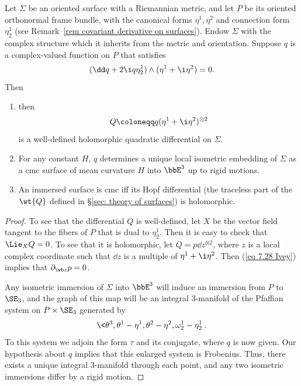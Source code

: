 \begin{prop}\label{prop 7.4.25 Ivey}
    Let $\Sigma$ be an oriented surface with a Riemannian metric, and let $P$ be its oriented orthonormal frame bundle, with the canonical forms $\eta^1,\eta^2$ and connection form $\eta^1_2$ (see Remark~\ref{rem covariant derivative on surfaces}). Endow $\Sigma$ with the complex structure which it inherits from the metric and orientation. Suppose $q$ is a complex-valued function on $P$ that satisfies 
    \[(\dd q+2\i q\eta^1_2)\wedge(\eta^1+\i \eta^2)=0.\label{eq 7.28 Ivey}\]
    Then 
    \begin{enumerate}
        \item then
        \[Q\coloneqq q(\eta^1+\i \eta^2)^{\otimes 2}\]
        is a well-defined holomorphic quadratic differential on $\Sigma$.
        \item For any constant $H$, $q$ determines a unique local isometric embedding of $\Sigma$ as a \gls{cmc} surface of mean curvature $H$ into $\bbE^3$ up to rigid motions.
        \item An immersed surface is \gls{cmc} iff its Hopf differential (the traceless part of the $\wt{Q}$ defined in \S\ref{sec: theory of surfaces}) is holomorphic.
    \end{enumerate}
\end{prop}
\begin{proof}
    To see that the differential $Q$ is well-defined, let $X$ be the vector field tangent to the fibers of $P$ that is dual to $\eta^1_2$. Then it is easy to check that $\Lie_X Q=0$. To see that it is holomorphic, let $Q=p\dd z^{\otimes 2}$, where $z$ is a local complex coordinate such that $\dd z$ is a multiple of $\eta^1+\i \eta^2$. Then (\ref{eq 7.28 Ivey}) implies that $\partial_{\wb z}p=0$.

    Any isometric immersion of $\Sigma$ into $\bbE^3$ will induce an immersion from $P$ to $\SE_3$, and the graph of this map will be an integral $3$-manifold of the Pfaffian system on $P\times \SE_3$ generated by 
    \[\<\theta^3,\theta^1-\eta^1,\theta^2-\eta^2,\omega^1_2-\eta^1_2\>.\]
    To this system we adjoin the form $\tau$ and its conjugate, where $q$ is now given. Our hypothesis about $q$ implies that this enlarged system is Frobenius. Thus, there exists a unique integral $3$-manifold through each point, and any two isometric immersions differ by a rigid motion.
\end{proof}

